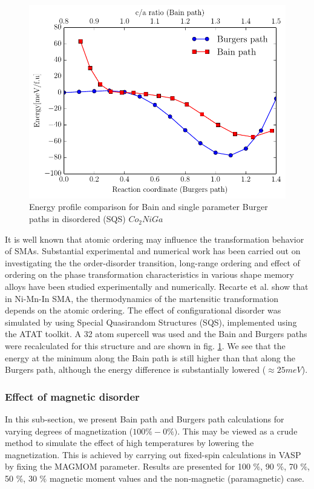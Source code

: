 \documentclass[%
preprint,
 amsmath,amssymb,
 aps,
prb,
showkeys,
]{revtex4-1}
\begin{document}
\begin{figure}[htp!]
  \includegraphics[scale=1.0]{figure_8}
  \caption{Energy profile comparison for Bain and single parameter Burger  paths in  disordered (SQS) $Co_2NiGa$}
  \label{SQS}
\end{figure}

It is well known that atomic ordering may influence the transformation behavior of SMAs. Substantial experimental and numerical work has been carried out on investigating the the order-disorder transition, long-range ordering and effect of ordering on the phase transformation characteristics in various shape memory alloys \cite{singh2011effect,Obradobccstability1997,recarte2012dependence} have been studied experimentally and numerically. Recarte et al. show that in Ni-Mn-In SMA, the thermodynamics of the martensitic transformation depends on the atomic ordering\cite{recarte2012dependence}.
The effect of configurational disorder was simulated by using Special Quasirandom Structures (SQS)\cite{zunger1990special}, implemented using the ATAT toolkit. A 32 atom supercell was used and the Bain and Burgers paths were recalculated for this structure and are shown in fig. \ref{SQS}. We see that the energy at the minimum along the Bain path is still higher than that along the Burgers path, although the energy difference is substantially lowered ($\approx 25 meV $). 

\subsubsection{Effect of magnetic disorder}
\label{mag_disorder}
 In this sub-section, we present  Bain path and Burgers path calculations for varying degrees of magnetization ($100 \% - 0 \%)$.  This may be viewed as a crude method to simulate the effect of high temperatures  by lowering the magnetization. This is achieved by carrying out fixed-spin calculations in VASP by fixing the MAGMOM parameter.  Results are presented for 100 $\%$,  90 $\%$, 70 $\%$, 50 $\%$, 30 $\%$  magnetic moment values and the non-magnetic (paramagnetic) case. 
\end{document}
